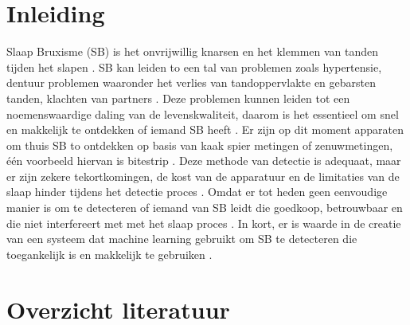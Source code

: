 \documentclass{hogent-article}
\affiliation{
  \textsuperscript{1} \href{mailto:brent.decorte@student.hogent.be}{brent.decorte@student.hogent.be}}
\begin{document}
\flushbottom %
\maketitle %
\tableofcontents %
\thispagestyle{empty} %


\section{Inleiding}

Slaap Bruxisme (SB) is het onvrijwillig knarsen en het klemmen van tanden tijden het slapen .
SB kan leiden to een tal van problemen zoals hypertensie, dentuur problemen waaronder het verlies van tandoppervlakte en gebarsten tanden, klachten van partners .
Deze problemen kunnen leiden tot een noemenswaardige daling van de levenskwaliteit, daarom is het essentieel om snel en makkelijk te ontdekken of iemand SB heeft .
\bigbreak
Er zijn op dit moment apparaten om thuis SB to ontdekken op basis van kaak spier metingen of zenuwmetingen, één voorbeeld hiervan is bitestrip \cite{Shochat_2007} .
Deze methode van detectie is adequaat, maar er zijn zekere tekortkomingen, de kost van de apparatuur en de limitaties van de slaap hinder tijdens het detectie proces .
Omdat er tot heden geen eenvoudige manier is om te detecteren of iemand van SB leidt die goedkoop, betrouwbaar en die niet interfereert met met het slaap proces .
\bigbreak
In kort, er is waarde in de creatie van een systeem dat machine learning gebruikt om SB te detecteren die toegankelijk is en makkelijk te gebruiken .






\section{Overzicht literatuur}

\end{document}
